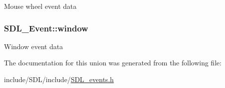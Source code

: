 Mouse wheel event data \hypertarget{union_s_d_l___event_a826936b3275406d857bc6654669fae71}{
\subsubsection[{window}]{ S\-D\-L\-\_\-\-Event\-::window}}\label{union_s_d_l___event_a826936b3275406d857bc6654669fae71}
Window event data 

The documentation for this union was generated from the following file\-:\begin{DoxyCompactItemize}
\item 
include/\-S\-D\-L/include/\hyperlink{_s_d_l__events_8h}{S\-D\-L\-\_\-events.\-h}\end{DoxyCompactItemize}

